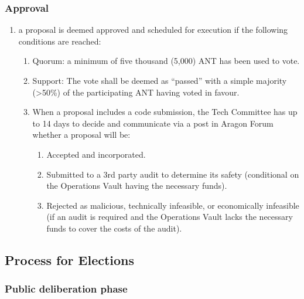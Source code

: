 \subsubsection*{Approval} 
\begin{enumerate}
	\item a proposal is deemed approved and scheduled for execution if the following conditions are reached:
	\begin{enumerate}
		\item Quorum: a minimum of five thousand (5,000) \ac{ANT} has been used to vote.
		\item  Support: The vote shall be deemed as “passed” with a simple majority (>50\%) of the participating \ac{ANT} having voted in favour.
		\item When a proposal includes a code submission, the Tech Committee has up to 14 days to decide and communicate via a post in Aragon Forum whether a proposal will be:
		\begin{enumerate}
			\item Accepted and incorporated.
			\item Submitted to a 3rd party audit to determine its safety (conditional on the Operations Vault having the necessary funds).
			\item Rejected as malicious, technically infeasible, or economically infeasible (if an audit is required and the Operations Vault lacks the necessary funds to cover the costs of the audit).
		\end{enumerate}
	\end{enumerate}
\end{enumerate}


\subsection{Process for Elections}


\subsubsection*{Public deliberation phase} 

